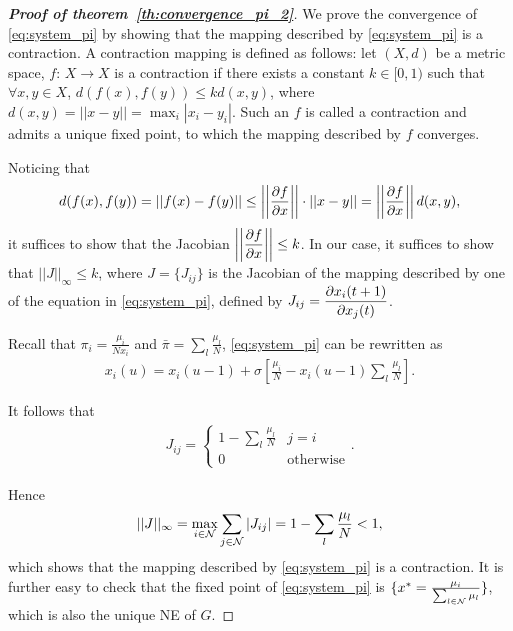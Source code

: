 \documentclass[12pt, onecolumn]{IEEEtran}
\theoremstyle{plain}
\theoremstyle{definition}
\begin{document}
\begin{proof}[\textbf{Proof of theorem~\ref{th:convergence_pi_2}}]

We prove the convergence of \eqref{eq:system_pi} by showing that the mapping described by \eqref{eq:system_pi} is a contraction. A contraction mapping is defined \cite{Abraham88} as follows: let
$(X,d)$ be a metric space, $f$: $X \rightarrow X$ is a contraction
if there exists a constant $k\in[0,1)$ such that $\forall x, y \in
X$, $d(f(x), f(y)) \leq kd(x,y)$, where $d(x, y)= ||x-y|| =\max_i
|x_i - y_i|$. Such an $f$ is called a contraction and admits a unique fixed point, to which the mapping described by $f$ converges.

Noticing that
\begin{eqnarray*}
 d(f(x), f(y)) = ||f(x)-f(y)|| \leq
\left|\left|{\partial f \over
\partial x}\right|\right| \cdot||x-y||= \left|\left|{\partial f \over \partial x}\right|\right| d(x,y),
\end{eqnarray*}
it suffices to show that the Jacobian $\displaystyle \left|\left|{\partial f \over
\partial x}\right|\right| \leq k$. In our case, it suffices to show that $||J||_{\infty} \leq k$, where
$J=\{J_{ij}\}$ is the Jacobian of the mapping described by one of the equation in \eqref{eq:system_pi}, defined by
$\displaystyle J_{ij}={\partial x_i(t+1) \over
\partial x_j(t)}$.

Recall that $\pi_i=\frac{\mu_i}{Nx_i}$ and $\bar{\pi}=\sum_l \frac{\mu_l}{N}$, \eqref{eq:system_pi} can be rewritten as
\begin{eqnarray*}
x_i(u)=x_i(u-1)+\sigma\left[\frac{\mu_i}{N}-x_i(u-1)\sum_l \frac{\mu_l}{N}\right].
\end{eqnarray*}

It follows that
\vspace{-0.5cm}
\begin{eqnarray*}
J_{ij} =
\begin{cases}
\displaystyle 1-\sum_l \frac{\mu_l}{N} & j=i \\
0 & \text{otherwise}
\end{cases}.
\end{eqnarray*}

Hence
\vspace{-0.5cm}
\begin{eqnarray*}
||J||_{\infty}=\max_{i\in{\cal N}} \sum_{j\in{\cal N}} \left|J_{ij}\right|=1-\sum_l \frac{\mu_l}{N}<1,
\end{eqnarray*}
which shows that the mapping described by \eqref{eq:system_pi} is a contraction. It is further easy to check that the fixed point of \eqref{eq:system_pi} is $\{x^*=\frac{\mu_i}{\sum_{l\in{\cal N}} \mu_l}\}$, which is also the unique NE of $G$.
\end{proof}
\end{document}
